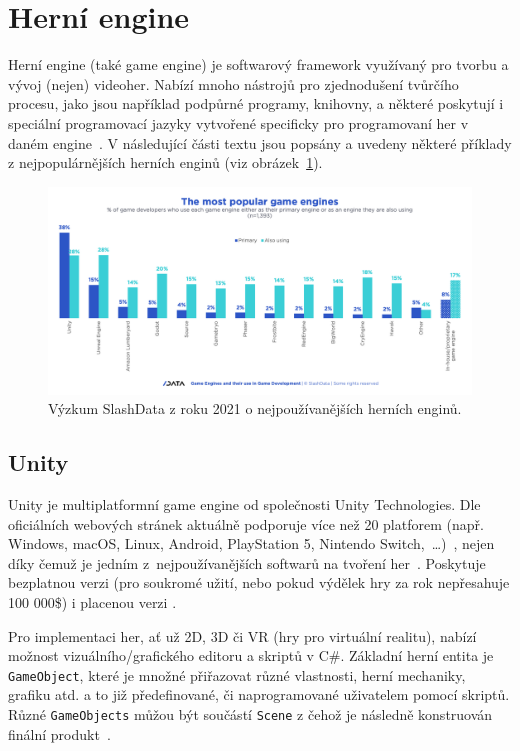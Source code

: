 \section{Herní engine}\label{chap:Herní engine}
Herní engine (také game engine) je softwarový framework využívaný pro tvorbu a vývoj (nejen) videoher. Nabízí mnoho nástrojů pro zjednodušení tvůrčího procesu, jako jsou například podpůrné programy, knihovny, a některé poskytují i speciální programovací jazyky vytvořené specificky pro programovaní her v daném engine~\cite{Valencia-Garcia_2016}. V následující části textu jsou popsány a uvedeny některé příklady z nejpopulárnějších herních enginů (viz obrázek~\ref{fig:most_popular_game_engines}).
\begin{figure}[H]
    \vspace{0.5cm}
	\centering
	\includegraphics[width=\textwidth]{obrazky-figures/ch2/most_popular_game_engines.png}
	\caption{Výzkum SlashData z roku 2021 o nejpoužívanějších herních enginů.~\cite{SlashData_game-engines}}
	\label{fig:most_popular_game_engines}
\end{figure}

\subsection*{Unity}
Unity je multiplatformní game engine od společnosti Unity Technologies. Dle oficiálních webových stránek aktuálně podporuje více než 20 platforem (např. Windows, macOS, Linux, Android, PlayStation 5, Nintendo Switch,~\ldots)~\cite{unity_website}, nejen díky čemuž je jedním z~nejpoužívanějších softwarů na tvoření her~\cite{arnia_unity}. Poskytuje bezplatnou verzi (pro soukromé užití, nebo pokud výdělek hry za rok nepřesahuje 100 000\$) i placenou verzi . 

Pro implementaci her, ať už 2D, 3D či VR (hry pro virtuální realitu), nabízí možnost vizuálního/grafického editoru a skriptů v C\#. Základní herní entita je \verb|GameObject|, které je množné přiřazovat různé vlastnosti, herní mechaniky, grafiku atd. a to již předefinované, či naprogramované uživatelem pomocí skriptů. Různé \verb|GameObjects| můžou být součástí \verb|Scene| z čehož je následně konstruován finální produkt~\cite{hocking2015unity}.

